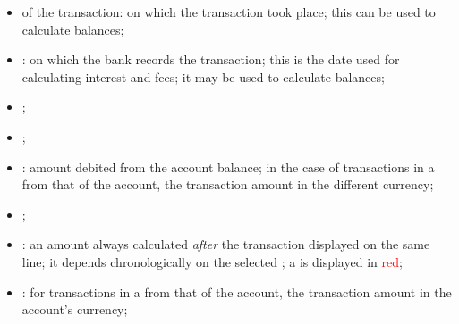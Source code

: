 \begin{itemize}
	\item {} of the transaction:  on which the transaction took place; this can be used to calculate balances;
	\item {}:  on which the bank records the transaction; this is the date used for calculating interest and fees; it may be used to calculate balances;
	\item {};
	\item {};
	\item {}: amount debited from the account balance; in the case of transactions in a  from that of the account, the transaction amount in the different currency;
	\item {};
	\item {}: an amount always calculated \emph{after} the transaction displayed on the same line; it depends chronologically on the selected ; a  is displayed in \textcolor{red}{red};
	\item {}: for transactions in a  from that of the account, the transaction amount in the account’s currency;

\end{itemize}
